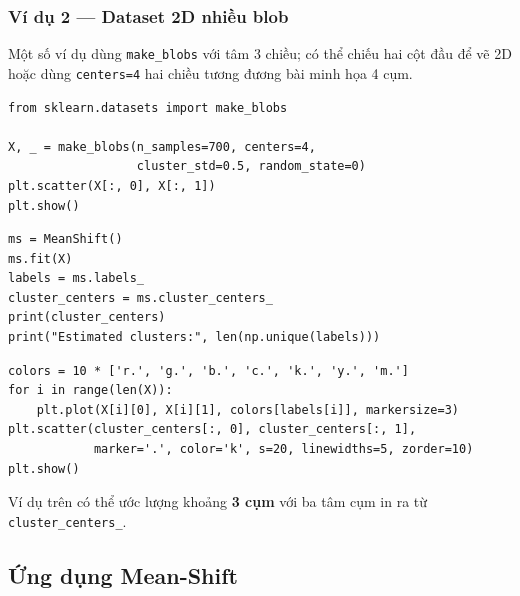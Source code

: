 \subsubsection{Ví dụ 2 --- Dataset 2D nhiều blob}

\begin{dongco}[title={make\_blobs 3D trong mã nguồn}]
Một số ví dụ dùng \texttt{make\_blobs} với tâm 3 chiều; có thể chiếu hai cột đầu để vẽ 2D hoặc dùng \texttt{centers=4} hai chiều tương đương bài minh họa 4 cụm.
\end{dongco}

\begin{vidu}[title={Sinh blob và vẽ}]
\begin{lstlisting}
from sklearn.datasets import make_blobs

X, _ = make_blobs(n_samples=700, centers=4,
                  cluster_std=0.5, random_state=0)
plt.scatter(X[:, 0], X[:, 1])
plt.show()
\end{lstlisting}
\end{vidu}

\begin{vidu}[title={Mean-Shift mặc định và in tâm}]
\begin{lstlisting}
ms = MeanShift()
ms.fit(X)
labels = ms.labels_
cluster_centers = ms.cluster_centers_
print(cluster_centers)
print("Estimated clusters:", len(np.unique(labels)))
\end{lstlisting}
\end{vidu}

\begin{vidu}[title={Vẽ từng điểm theo nhãn}]
\begin{lstlisting}
colors = 10 * ['r.', 'g.', 'b.', 'c.', 'k.', 'y.', 'm.']
for i in range(len(X)):
    plt.plot(X[i][0], X[i][1], colors[labels[i]], markersize=3)
plt.scatter(cluster_centers[:, 0], cluster_centers[:, 1],
            marker='.', color='k', s=20, linewidths=5, zorder=10)
plt.show()
\end{lstlisting}
\end{vidu}

\begin{tinhchat}[title={Kết quả mẫu}]
Ví dụ trên có thể ước lượng khoảng \textbf{3 cụm} với ba tâm cụm in ra từ \texttt{cluster\_centers\_}.
\end{tinhchat}

\subsection{Ứng dụng Mean-Shift}

